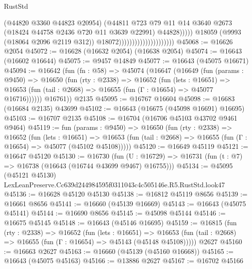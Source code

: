 \begin{lexlean}{RustStd}
\begin{coremodule}
                                                      (@44820 @3360 @44823 @20954)
                                                      (@44811
                                                        @723
                                                        @79
                                                        @11
                                                        @14
                                                        @3640
                                                        @2673
                                                        (@18424 @44758 @2436 @720 @11 @3639 @22991)
                                                        @44828)))))
                                              @18059
                                              (@9993 (@18064 @2096 @2119 @312))
                                              @18072)))))))))))))))))))))
@45068 := @16626 @2054
@45072 := @16628 (@16632 @2054) (@16638 @2054)
@45074 := @16643 (@16602 @16644)
@45075 := @9457 @14849
@45077 := @16643 (@45075 @16671)
@45094 := @16642
    (fun (fn : @58) =>
    @45074
      (@16647
        (@16649
          (fun (params : @9450) =>
          @16650
            (fun (rty : @2338) =>
            @16652
              (fun (lets : @16651) =>
              @16653 (fun (tail : @2668) => @16655 (fun (Γ : @16654) => @45077 @16716))))))
        @16761))
    @2135
@45095 := @16767 @16604
@45098 := @16683 (@16684 @2135) @43699
@45102 := @16643 (@16675 (@45098 @16691) @16695)
@45103 := @16707 @2135
@45108 := @16704 (@16706 @45103 @43702 @9461 @9464)
@45119 := fun (params : @9450) =>
  @16650
    (fun (rty : @2338) =>
    @16652
      (fun (lets : @16651) =>
      @16653 (fun (tail : @2668) => @16655 (fun (Γ : @16654) => @45077 (@45102 @45108)))))
@45120 := @16649 @45119
@45121 := @16647 @45120
@45130 := @16730
    (fun (U : @16729) => @16731 (fun (t : @7) => @16738 (@16643 (@16744 @43699 @9467) @16755)))
@45134 := @45095 (@45121 @45130) LexLeanPreserve.Cc639d244984595f0311043c4c505146e.R5.RustStd.look47
@45136 := @16628 @45120 @45130
@45138 := @16812 @45119 @8656
@45139 := @16661 @8656
@45141 := @16660 (@45139 @16669)
@45143 := @16643 (@45075 @45141)
@45144 := @16690 @8656
@45145 := @45098 @45144
@45146 := @16675 @45145
@45148 := @16643 (@45146 @16695)
@45159 := @16815
    (fun (rty : @2338) =>
    @16652
      (fun (lets : @16651) =>
      @16653 (fun (tail : @2668) => @16655 (fun (Γ : @16654) => @45143 (@45148 @45108)))))
    @2627
@45160 := @16663 @2627
@45163 := @16660 (@45139 (@45160 @16668))
@45165 := @16643 (@45075 @45163)
@45166 := @13886 @2627
@45167 := @16702 @45166

\end{coremodule}
\end{lexlean}
